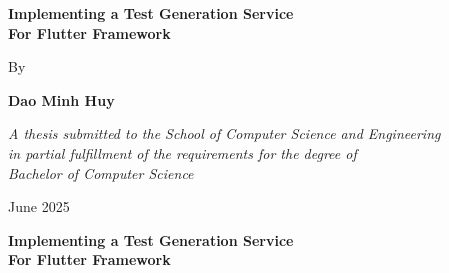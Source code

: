 \documentclass[12pt, twoside]{report}
\begin{document}
\begin{titlepage}
	\vspace{1.5cm}
\textbf{\large Implementing a Test Generation Service \\ For Flutter Framework}
														
	\vspace{1.5cm}
	By \par \textbf{Dao Minh Huy}
														
	\vspace{4.5cm}
	\textit{A thesis submitted to the School of Computer Science and Engineering \\ 
    in partial fulfillment of the requirements for the degree of \\ Bachelor of Computer Science}
														
	\vspace{3.5cm}
	 \par June 2025
														
	\newpage
													
	\centering
														
	\textbf{\large Implementing a Test Generation Service \\ For Flutter Framework}\par
	\vspace{4cm}
														
	\hspace{7cm}
	\par
	\vspace{2cm}
														
	\hspace{7cm}
	\makebox[7cm][l]{\underline{\hspace{7cm}}}
	\par \hspace{7cm}
	\par
	\vspace{2cm}
														
	\hspace{7cm}
	\makebox[7cm][l]{\underline{\hspace{7cm}}}
	\par \hspace{7cm}
	\par
	\vspace{2cm}
														
	\hspace{7cm}
	\makebox[7cm][l]{\underline{\hspace{7cm}}}
	\par \hspace{7cm}
	\par
	\vspace{2cm}
														

\end{titlepage}
\end{document}
